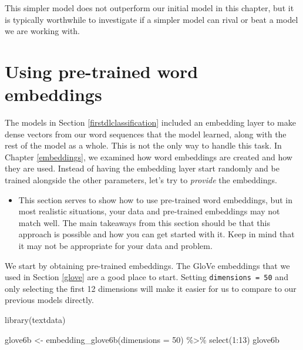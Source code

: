 \documentclass[
]{krantz}
\makeatletter
\newenvironment{Shaded}{\begin{snugshade}}{\end{snugshade}}
\newcommand{\AttributeTok}[1]{\textcolor[rgb]{0.77,0.63,0.00}{#1}}
\newcommand{\DecValTok}[1]{\textcolor[rgb]{0.00,0.00,0.81}{#1}}
\newcommand{\FunctionTok}[1]{\textcolor[rgb]{0.00,0.00,0.00}{#1}}
\newcommand{\NormalTok}[1]{#1}
\newcommand{\OtherTok}[1]{\textcolor[rgb]{0.56,0.35,0.01}{#1}}
\newcommand{\SpecialCharTok}[1]{\textcolor[rgb]{0.00,0.00,0.00}{#1}}
\newenvironment{kframe}{%
\medskip{}
\setlength{\fboxsep}{.8em}
 \def\at@end@of@kframe{}%
 \ifinner\ifhmode%
  \def\at@end@of@kframe{\end{minipage}}%
  \begin{minipage}{\columnwidth}%
 \fi\fi%
 \def\FrameCommand##1{\hskip\@totalleftmargin \hskip-\fboxsep
 \colorbox{shadecolor}{##1}\hskip-\fboxsep
     \hskip-\linewidth \hskip-\@totalleftmargin \hskip\columnwidth}%
 \MakeFramed {\advance\hsize-\width
   \@totalleftmargin\z@ \linewidth\hsize
   \@setminipage}}%
 {\par\unskip\endMakeFramed%
 \at@end@of@kframe}
\renewenvironment{Shaded}{\begin{kframe}}{\end{kframe}}
\newenvironment{rmdblock}[1]
  {\begin{shaded*}
  \begin{itemize}[left = -1cm, labelsep = 1cm]
  \renewcommand{\labelitemi}{
    \raisebox{-.7\height}[0pt][0pt]{
      {\setkeys{Gin}{width=3em,keepaspectratio}\texttt{[image: images/\#1]}}
    }
  }
 
  \item
  }
  {
  \end{itemize}
  \end{shaded*}
  }
\newenvironment{rmdwarning}
  {\begin{rmdblock}{warning}}
  {\end{rmdblock}}
\makeatother
\begin{document}
This simpler model does not outperform our initial model in this chapter, but it is typically worthwhile to investigate if a simpler model can rival or beat a model we are working with.

\hypertarget{using-pre-trained-word-embeddings}{%
\section{Using pre-trained word embeddings}\label{using-pre-trained-word-embeddings}}

The models in Section \ref{firstdlclassification} included an embedding layer to make dense vectors from our word sequences that the model learned, along with the rest of the model as a whole. This is not the only way to handle this task. In Chapter \ref{embeddings}, we examined how word embeddings are created and how they are used. Instead of having the embedding layer start randomly and be trained alongside the other parameters, let's try to \emph{provide} the embeddings.

\begin{rmdwarning}
This section serves to show how to use pre-trained word embeddings, but
in most realistic situations, your data and pre-trained embeddings may
not match well. The main takeaways from this section should be that this
approach is possible and how you can get started with it. Keep in mind
that it may not be appropriate for your data and problem.
\end{rmdwarning}

We start by obtaining pre-trained embeddings. The GloVe embeddings that we used in Section \ref{glove} are a good place to start. Setting \texttt{dimensions\ =\ 50} and only selecting the first 12 dimensions will make it easier for us to compare to our previous models directly.

\begin{Shaded}
\begin{Highlighting}[]
\FunctionTok{library}\NormalTok{(textdata)}

\NormalTok{glove6b }\OtherTok{\textless{}{-}} \FunctionTok{embedding\_glove6b}\NormalTok{(}\AttributeTok{dimensions =} \DecValTok{50}\NormalTok{) }\SpecialCharTok{\%\textgreater{}\%} \FunctionTok{select}\NormalTok{(}\DecValTok{1}\SpecialCharTok{:}\DecValTok{13}\NormalTok{)}
\NormalTok{glove6b}
\end{Highlighting}
\end{Shaded}
\end{document}
